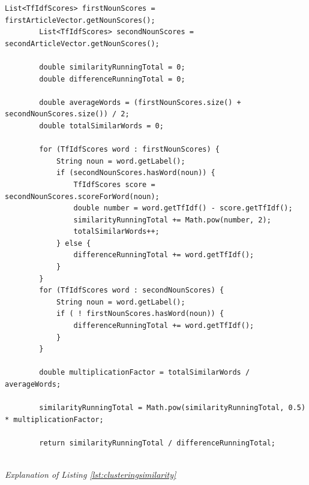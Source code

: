 \documentclass[12pt]{article}
\begin{document}
\begin{lstlisting}[style=MyJava, firstnumber=1, label={lst:clusteringsimilarity}, caption={Finding similarities between two ArticleVectors}]
	List<TfIdfScores> firstNounScores = firstArticleVector.getNounScores();
        List<TfIdfScores> secondNounScores = secondArticleVector.getNounScores();
        
        double similarityRunningTotal = 0;
        double differenceRunningTotal = 0;
        
        double averageWords = (firstNounScores.size() + secondNounScores.size()) / 2;
        double totalSimilarWords = 0;
        
        for (TfIdfScores word : firstNounScores) {
            String noun = word.getLabel();
            if (secondNounScores.hasWord(noun)) {
                TfIdfScores score = secondNounScores.scoreForWord(noun);
                double number = word.getTfIdf() - score.getTfIdf();
                similarityRunningTotal += Math.pow(number, 2);
                totalSimilarWords++;
            } else {
                differenceRunningTotal += word.getTfIdf();
            }
        }
        for (TfIdfScores word : secondNounScores) {
            String noun = word.getLabel();
            if ( ! firstNounScores.hasWord(noun)) {
                differenceRunningTotal += word.getTfIdf();
            }
        }
        
        double multiplicationFactor = totalSimilarWords / averageWords;
        
        similarityRunningTotal = Math.pow(similarityRunningTotal, 0.5) * multiplicationFactor;
        
        return similarityRunningTotal / differenceRunningTotal; 
        
\end{lstlisting}

\emph{Explanation of Listing \ref{lst:clusteringsimilarity}}
\end{document}
